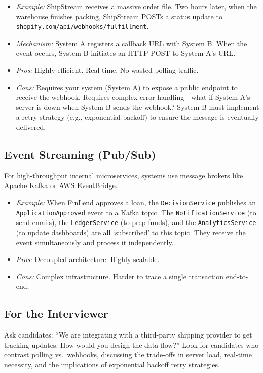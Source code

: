 \documentclass[
  11pt,
  openany,
  oneside]{book}
\providecommand{\tightlist}{%
  \setlength{\itemsep}{0pt}\setlength{\parskip}{0pt}}
\renewenvironment{quote}{\begin{customquote}}{\end{customquote}}
\begin{document}
\begin{itemize}
\tightlist
\item
  \emph{Example:} ShipStream receives a massive order file. Two hours
  later, when the warehouse finishes packing, ShipStream POSTs a status
  update to \texttt{shopify.com/api/webhooks/fulfillment}.
\item
  \emph{Mechanism:} System A registers a callback URL with System B.
  When the event occurs, System B initiates an HTTP POST to System A's
  URL.
\item
  \emph{Pros:} Highly efficient. Real-time. No wasted polling traffic.
\item
  \emph{Cons:} Requires your system (System A) to expose a public
  endpoint to receive the webhook. Requires complex error
  handling---what if System A's server is down when System B sends the
  webhook? System B must implement a retry strategy (e.g., exponential
  backoff) to ensure the message is eventually delivered.
\end{itemize}

\subsection{Event Streaming (Pub/Sub)}\label{event-streaming-pubsub}

For high-throughput internal microservices, systems use message brokers
like Apache Kafka or AWS EventBridge.

\begin{itemize}
\tightlist
\item
  \emph{Example:} When FinLend approves a loan, the
  \texttt{DecisionService} publishes an \texttt{ApplicationApproved}
  event to a Kafka topic. The \texttt{NotificationService} (to send
  emails), the \texttt{LedgerService} (to prep funds), and the
  \texttt{AnalyticsService} (to update dashboards) are all `subscribed'
  to this topic. They receive the event simultaneously and process it
  independently.
\item
  \emph{Pros:} Decoupled architecture. Highly scalable.
\item
  \emph{Cons:} Complex infrastructure. Harder to trace a single
  transaction end-to-end.
\end{itemize}

\begin{quote}
\subsection{For the Interviewer}\label{for-the-interviewer}

Ask candidates: ``We are integrating with a third-party shipping
provider to get tracking updates. How would you design the data flow?''
Look for candidates who contrast polling vs.~webhooks, discussing the
trade-offs in server load, real-time necessity, and the implications of
exponential backoff retry strategies.
\end{quote}
\end{document}
